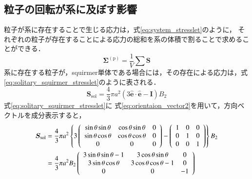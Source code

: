 \subsection{粒子の回転が系に及ぼす影響}
粒子が系に存在することで生じる応力は，式\eqref{eq:system_stresslet}のように，
それぞれの粒子が存在することによる応力の総和を系の体積で割ることで求めることができる\cite{dilute_squirmer}．
    \begin{equation}
        \boldsymbol{\Sigma}^\mathrm{(p)} = \frac{1}{V} \sum \boldsymbol{S}
        \label{eq:system_stresslet}
    \end{equation}
系に存在する粒子が，squirmer単体である場合には，その存在による応力は，式\eqref{eq:solitary_squirmer_stresslet}のように表される\cite{dilute_squirmer}．
    \begin{equation}
        \boldsymbol{S}_\mathrm{sol} = \frac{4}{3} \pi a^2 (3 \boldsymbol{\hat{e} \cdot \hat{e}} - \boldsymbol{I}) B_2
        \label{eq:solitary_squirmer_stresslet}
    \end{equation}
式\eqref{eq:solitary_squirmer_stresslet}に
式\eqref{eq:orientaion_vector2}を用いて，方向ベクトルを成分表示すると，
    \begin{align}
        \boldsymbol{S}_\mathrm{sol}
        &= \frac{4}{3} \pi a^2
        \left\{
        3
        \left(
            \begin{array}{ccc}
                \sin{\theta} \sin{\theta} & \cos{\theta} \sin{\theta} & 0 \\
                \sin{\theta} \cos{\theta} & \cos{\theta} \cos{\theta} & 0 \\
                0                         & 0                         & 0
            \end{array}
        \right)
        - \left(
            \begin{array}{ccc}
                1 & 0 & 0 \\
                0 & 1 & 0 \\
                0 & 0 & 1
            \end{array}
        \right)
        \right\}
        B_2 \notag \\
        &= \frac{4}{3} \pi a^2 B_2
        \left(
            \begin{array}{ccc}
                3 \sin{\theta} \sin{\theta} - 1 & 3 \cos{\theta} \sin{\theta}     &  0 \\
                3 \sin{\theta} \cos{\theta}     & 3 \cos{\theta} \cos{\theta} - 1 &  0 \\
                0                               & 0                               & -1
            \end{array}
        \right)
        \label{eq:solitary_squirmer_stresslet_elements}
    \end{align}
